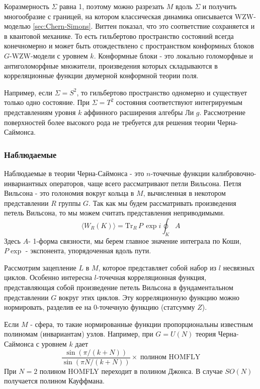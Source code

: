 \documentclass[a4paper,12pt]{article}
\theoremstyle{definition} \newtheorem{Def}{Definition}
\begin{document}
Коразмерность $\Sigma$ равна 1, поэтому можно разрезать $M$ вдоль $\Sigma$ и получить многообразие с границей, на котором классическая динамика описывается WZW-моделью \ref{sec:Chern-Simons}. Виттен показал, что это соответствие сохраняется и в квантовой механике. То есть гильбертово пространство состояний всегда конечномерно и может быть отождествлено с пространством конформных блоков $G$-WZW-модели с уровнем $k$. Конформные блоки - это локально голоморфные и антиголоморфные множители, произведения которых складываются в корреляционные функции двумерной конформной теории поля. 

Например, если $\Sigma=S^2$, то гильбертово пространство одномерно и существует только одно состояние. При $\Sigma=T^2$ состояния соответствуют интегрируемым представлениям уровня $k$  аффинного расширения алгебры Ли $g$. Рассмотрение поверхностей более высокого рода не требуется для решения теории Черна-Саймонса.

\subsubsection{Наблюдаемые}
\label{sec:observables}

Наблюдаемые в теории Черна-Саймонса - это $n$-точечные функции калибровочно-инвариантных операторов, чаще всего рассматривают петли Вильсона. Петля Вильсона - это голономия вокруг кольца в $M$, вычисленная в некотором представлении $R$ группы $G$. Так как мы будем рассматривать произведения петель Вильсона, то мы можем считать представления неприводимыми.
\begin{equation}
  \label{eq:33}
    \langle W_R(K) \rangle =\text{Tr}_R \, P \, \exp{i \oint_K A}  
\end{equation}
Здесь $A$- 1-форма связности, мы берем главное значение интеграла по Коши, $P \exp$ - экспонента, упорядоченная вдоль пути.

Рассмотрим зацепление $L$ в $M$, которое представляет собой набор из $l$ несвязных циклов. Особенно интересна $l$-точечная корреляционная функция, представляющая собой произведение петель Вильсона в фундаментальном представлении $G$ вокруг этих циклов. Эту корреляционную функцию можно нормировать, разделив ее на 0-точечную функцию (статсумму $Z$).

Если $M$ - сфера, то такие нормированные функции пропорциональны известным полиномам (инвариантам) узлов. Например, при $G=U(N)$ теория Черна-Саймонса с уровнем $k$ дает
\begin{equation}
  \label{eq:34}
      \frac{\sin(\pi/(k+N))}{\sin(\pi N/(k+N))}\times\;\mbox{полином HOMFLY}
\end{equation}
При $N=2$ полином HOMFLY переходит в полином Джонса. В случае $SO(N)$ получается полином Кауффмана.
\end{document}
